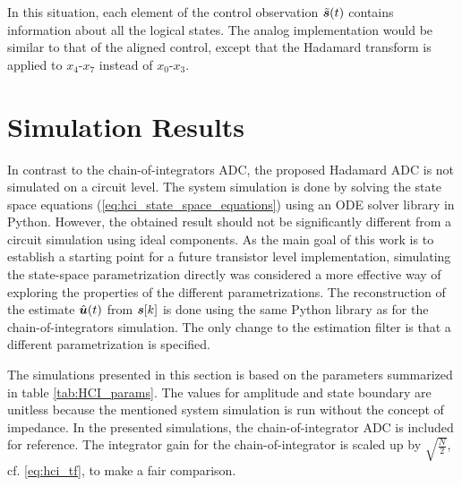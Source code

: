In this situation, each element of the control observation $\tilde{\bm{s}}(t)$ contains information about all the logical states. The analog implementation would be similar to that of the aligned control, except that the Hadamard transform is applied to $x_4$-$x_7$ instead of $x_0$-$x_3$.













\section{Simulation Results}
In contrast to the chain-of-integrators ADC, the proposed Hadamard ADC is not simulated on a circuit level. The system simulation is done by solving the state space equations (\ref{eq:hci_state_space_equations}) using an ODE solver library in Python. However, the obtained result should not be significantly different from a circuit simulation using ideal components. As the main goal of this work is to establish a starting point for a future transistor level implementation, simulating the state-space parametrization directly was considered a more effective way of exploring the properties of the different parametrizations. The reconstruction of the estimate $\hat{\bm{u}}(t)$ from $\bm{s}[k]$ is done using the same Python library as for the chain-of-integrators simulation. The only change to the estimation filter is that a different parametrization is specified.

The simulations presented in this section is based on the parameters summarized in table \ref{tab:HCI_params}. The values for amplitude and state boundary are unitless because the mentioned system simulation is run without the concept of impedance. In the presented simulations, the chain-of-integrator ADC is included for reference. The integrator gain for the chain-of-integrator is scaled up by $\sqrt{\frac{N}{2}}$, cf. \ref{eq:hci_tf}, to make a fair comparison.



